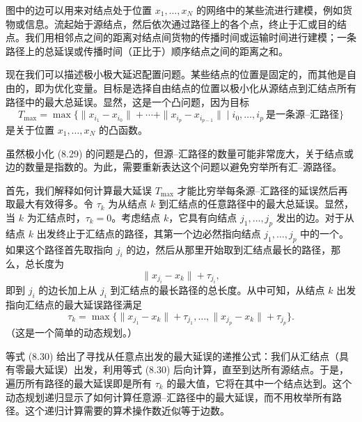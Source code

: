 \documentclass[UTF8,12pt,a4paper,fontset=fandol]{ctexart}
\begin{document}
图中的边可以用来对结点处于位置 $x_1,\ldots,x_N$ 的网络中的某些流进行建模，例如货物或信息。流起始于源结点，然后依次通过路径上的各个点，终止于汇或目的结点。我们用相邻点之间的距离对结点间货物的传播时间或运输时间进行建模；一条路径上的总延误或传播时间（正比于）顺序结点之间的距离之和。

现在我们可以描述极小极大延迟配置问题。某些结点的位置是固定的，而其他是自由的，即为优化变量。目标是选择自由结点的位置以极小化从源结点到汇结点所有路径中的最大总延误。显然，这是一个凸问题，因为目标
\[
T_{\max}=\max\{\|x_{i_1}-x_{i_0}\|+\cdots+\|x_{i_p}-x_{i_{p-1}}\|\mid i_0,\ldots,i_p\ \mbox{是一条源--汇路径}\}
\tag{8.29}
\]
是关于位置 $x_1,\ldots,x_N$ 的凸函数。

虽然极小化 (8.29) 的问题是凸的，但源--汇路径的数量可能非常庞大，关于结点或边的数量是指数的。为此，需要重新表达这个问题以避免穷举所有汇--源路径。

首先，我们解释如何计算最大延误 $T_{\max}$ 才能比穷举每条源--汇路径的延误然后再取最大有效得多。令 $\tau_k$ 为从结点 $k$ 到汇结点的任意路径中的最大总延误。显然，当 $k$ 为汇结点时，$\tau_k=0$。考虑结点 $k$，它具有向结点 $j_1,\ldots,j_p$ 发出的边。对于从结点 $k$ 出发终止于汇结点的路径，其第一个边必然指向结点 $j_1,\ldots,j_p$ 中的一个。如果这个路径首先取指向 $j_i$ 的边，然后从那里开始取到汇结点最长的路径，那么，总长度为
\[
\|x_{j_i}-x_k\|+\tau_{j_i},
\]
即到 $j_i$ 的边长加上从 $j_i$ 到汇结点的最长路径的总长度。从中可知，从结点 $k$ 出发指向汇结点的最大延误路径满足
\[
\tau_k=\max\{\|x_{j_1}-x_k\|+\tau_{j_1},\ldots,\|x_{j_p}-x_k\|+\tau_{j_p}\}.
\tag{8.30}
\]
（这是一个简单的动态规划。）

等式 (8.30) 给出了寻找从任意点出发的最大延误的递推公式：我们从汇结点（具有零最大延误）出发，利用等式 (8.30) 后向计算，直至到达所有源结点。于是，遍历所有路径的最大延误即是所有 $\tau_k$ 的最大值，它将在其中一个结点达到。这个动态规划递归显示了如何计算任意源--汇路径中的最大延误，而不用枚举所有路径。这个递归计算需要的算术操作数近似等于边数。
\end{document}
